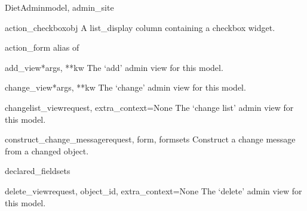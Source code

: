 \documentclass[letterpaper,10pt,english]{sphinxmanual}
\begin{document}
\hypertarget{data.admin.DietAdmin}{}\begin{classdesc}{DietAdmin}{model, admin\_site}~

\hypertarget{data.admin.DietAdmin.action_checkbox}{}\begin{methoddesc}{action\_checkbox}{obj}
A list\_display column containing a checkbox widget.
\end{methoddesc}

\hypertarget{data.admin.DietAdmin.action_form}{}\begin{memberdesc}{action\_form}
alias of 
\end{memberdesc}

\hypertarget{data.admin.DietAdmin.add_view}{}\begin{methoddesc}{add\_view}{*args, **kw}
The `add' admin view for this model.
\end{methoddesc}

\hypertarget{data.admin.DietAdmin.change_view}{}\begin{methoddesc}{change\_view}{*args, **kw}
The `change' admin view for this model.
\end{methoddesc}

\hypertarget{data.admin.DietAdmin.changelist_view}{}\begin{methoddesc}{changelist\_view}{request, extra\_context=None}
The `change list' admin view for this model.
\end{methoddesc}

\hypertarget{data.admin.DietAdmin.construct_change_message}{}\begin{methoddesc}{construct\_change\_message}{request, form, formsets}
Construct a change message from a changed object.
\end{methoddesc}

\hypertarget{data.admin.DietAdmin.declared_fieldsets}{}\begin{memberdesc}{declared\_fieldsets}\end{memberdesc}

\hypertarget{data.admin.DietAdmin.delete_view}{}\begin{methoddesc}{delete\_view}{request, object\_id, extra\_context=None}
The `delete' admin view for this model.
\end{methoddesc}


\end{classdesc}
\end{document}
